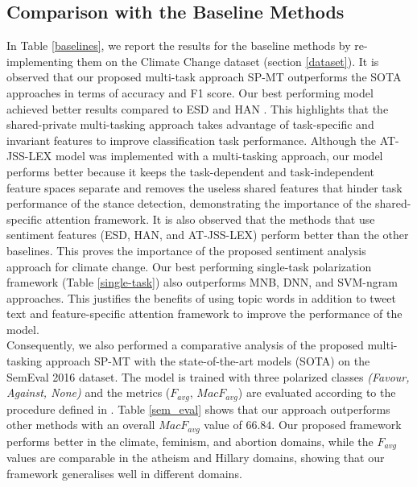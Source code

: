 \documentclass[letterpaper]{article}
\begin{document}
\subsection{Comparison with the Baseline Methods}
In Table \ref{baselines}, we report the results for the baseline methods by re-implementing them on the Climate Change dataset (section \ref{dataset}). It is observed that our proposed multi-task approach SP-MT outperforms the SOTA approaches in terms of accuracy and F1 score. Our best performing model achieved better results compared to ESD \cite{vychegzhanin2021new} and HAN \cite{wang2020neural}. This highlights that the shared-private multi-tasking approach takes advantage of task-specific and invariant features to improve classification task performance. Although the AT-JSS-LEX \cite{li2019multi} model was implemented with a multi-tasking approach, our model performs better because it keeps the task-dependent and task-independent feature spaces separate and removes the useless shared features that hinder task performance of the stance detection, demonstrating the importance of the shared-specific attention framework. It is also observed that the methods that use sentiment features (ESD, HAN, and AT-JSS-LEX) perform better than the other baselines. This proves the importance of the proposed sentiment analysis approach for climate change. Our best performing single-task polarization framework (Table \ref{single-task}) also outperforms MNB, DNN, and SVM-ngram approaches. This justifies the benefits of using topic words in addition to tweet text and feature-specific attention framework to improve the performance of the model. \\
\noindent Consequently, we also performed a comparative analysis of the proposed multi-tasking approach SP-MT with the state-of-the-art models (SOTA) on the SemEval 2016 dataset. The model is trained with three polarized classes \textit{(Favour, Against, None)} and the metrics ($F_{avg}$, $MacF_{avg}$) are evaluated according to the procedure defined in \cite{li2019multi}. Table \ref{sem_eval} shows that our approach outperforms other methods with an overall $MacF_{avg}$ value of $66.84$. Our proposed framework performs better in the climate, feminism, and abortion domains, while the $F_{avg}$ values are comparable in the atheism and Hillary domains, showing that our framework generalises well in different domains.
\end{document}
